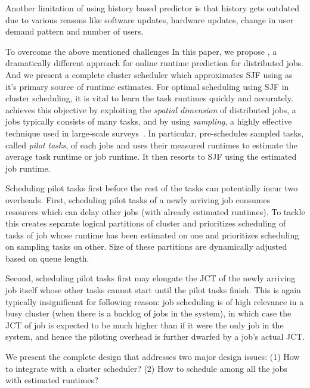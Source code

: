 
Another limitation of using history based predictor is that history gets
outdated due to various reasons like software updates, hardware updates, change
in user demand pattern and number of users.

To overcome the above mentioned challenges In this paper, we propose
\namepredict, a dramatically different approach for online runtime  prediction
for distributed jobs.  And we present \name a complete cluster scheduler which
approximates SJF using \namepredict as it's primary source of runtime
estimates.  For optimal scheduling using SJF in cluster scheduling, it is vital
to learn the task runtimes quickly and accurately. \namepredict achieves this
objective by exploiting the \textit{spatial dimension} of distributed jobs, \ie
a jobs typically consists of many tasks, and by using \textit{sampling}, a
highly effective technique used in large-scale
surveys~\cite{samplingOfPopulations}.  In particular, \namepredict
pre-schedules sampled tasks, called {\em pilot tasks}, of each jobs and uses
their measured runtimes to estimate the average task runtime or job runtime. It
then resorts to SJF using the estimated job runtime.

Scheduling pilot tasks first before the rest of the tasks can potentially incur
two overheads.  First, scheduling pilot tasks of a newly arriving job consumes
resources which can delay other jobs (with already estimated runtimes). To
tackle this \name creates separate logical partitions of cluster and
prioritizes scheduling of tasks of job whose runtime has been estimated on one
and prioritizes scheduling on sampling tasks on other. Size of these partitions
are dynamically adjusted based on queue length. 

Second, scheduling pilot tasks first may elongate the JCT of the newly
arriving job itself whose other tasks cannot start until the pilot
tasks finish. This is again typically insignificant for following reason:
job scheduling is of high relevance in a busy
cluster (when there is a backlog of jobs in the system), in which
case the JCT of job is expected to be much higher than if it were
the only job in the system, and hence the piloting overhead is
further dwarfed by a job's actual JCT.

We present the complete \name design that addresses two major design issues:
(1) How to integrate \namepredict with a cluster scheduler?
(2) How to schedule among all the jobs with estimated runtimes?

